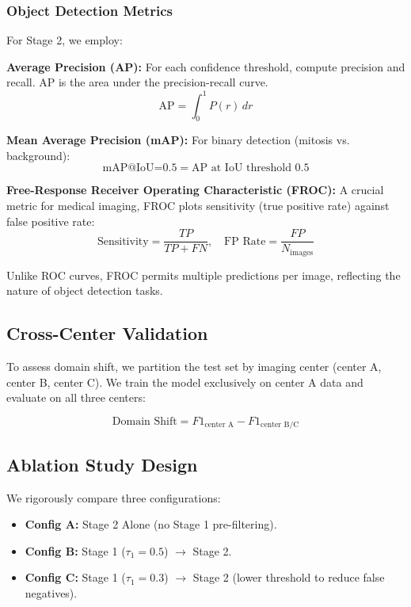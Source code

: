 \documentclass[journal]{IEEEtran}
\begin{document}
\subsubsection{Object Detection Metrics}
For Stage 2, we employ:

\textbf{Average Precision (AP):} For each confidence threshold, compute precision and recall. AP is the area under the precision-recall curve.
\begin{equation}
\text{AP} = \int_0^1 P(r) \, dr
\end{equation}

\textbf{Mean Average Precision (mAP):} For binary detection (mitosis vs. background):
\begin{equation}
\text{mAP@IoU=0.5} = \text{AP at IoU threshold } 0.5
\end{equation}

\textbf{Free-Response Receiver Operating Characteristic (FROC):} A crucial metric for medical imaging, FROC plots sensitivity (true positive rate) against false positive rate:
\begin{equation}
\text{Sensitivity} = \frac{TP}{TP + FN}, \quad \text{FP Rate} = \frac{FP}{N_{\text{images}}}
\end{equation}

Unlike ROC curves, FROC permits multiple predictions per image, reflecting the nature of object detection tasks.

\subsection{Cross-Center Validation}
To assess domain shift, we partition the test set by imaging center (center A, center B, center C). We train the model exclusively on center A data and evaluate on all three centers:

\begin{equation}
\text{Domain Shift} = F1_{\text{center A}} - F1_{\text{center B/C}}
\end{equation}

\subsection{Ablation Study Design}
We rigorously compare three configurations:

\begin{itemize}
\item \textbf{Config A:} Stage 2 Alone (no Stage 1 pre-filtering).
\item \textbf{Config B:} Stage 1 ($\tau_1 = 0.5$) $\to$ Stage 2.
\item \textbf{Config C:} Stage 1 ($\tau_1 = 0.3$) $\to$ Stage 2 (lower threshold to reduce false negatives).
\end{itemize}
\end{document}
